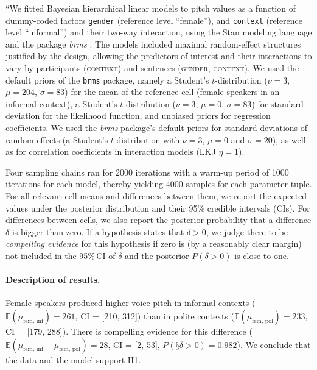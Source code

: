 \documentclass[nobib]{tufte-handout}
\begin{document}
``We fitted Bayesian hierarchical linear models to pitch values as a function of dummy-coded
factors \texttt{gender} (reference level ``female''), and \texttt{context} (reference level
``informal'') and their two-way interaction, using the Stan modeling language
\citep{carpenter2016stan} and the package \emph{brms} \citep{buerkner2016brms}. The models
included maximal random-effect structures justified by the design, allowing the predictors of
interest and their interactions to vary by participants (\textsc{context}) and sentences
(\textsc{gender}, \textsc{context}). We used the default priors of the \texttt{brms} package,
namely a Student's $t$-distribution ($\nu = 3$, $\mu = 204$, $\sigma = 83$) for the mean of the
reference cell (female speakers in an informal context), a Student's $t$-distribution ($\nu =
3$, $\mu = 0$, $\sigma = 83$) for standard deviation for the likelihood function, and unbiased
priors for regression coefficients. We used the \textit{brms} package's default priors for
standard deviations of random effects (a Student's $t$-distribution with $\nu = 3$, $\mu = 0$
and $\sigma = 20$), as well as for correlation coefficients in interaction models (LKJ $\eta =
1$).

Four sampling chains ran for 2000 iterations with a warm-up period of 1000 iterations for each
model, thereby yielding 4000 samples for each parameter tuple. For all relevant cell means and differences
between them, we report the expected values under the posterior distribution and their 95\%
credible intervals (CIs). For differences between cells, we also report the posterior
probability that a difference $\delta$ is bigger than zero. If a hypothesis states that
$\delta >0$, we judge there to be \emph{compelling evidence} for this hypothesis if zero is (by
a reasonably clear margin) not included in the 95\%\,CI of $\delta$ and the posterior $P(\delta
>0)$ is close to one.

\paragraph{Description of results.}  

Female speakers produced higher voice pitch in informal contexts ($\mathbb{E}(\mu_{\text{fem,
    inf}}) = 261$, CI = [210, 312]) than in polite contexts ($\mathbb{E}(\mu_{\text{fem,
    pol}}) = 233$, CI = [179, 288]). There is compelling evidence for this difference
($\mathbb{E}(\mu_{\text{fem, inf}} - \mu_{\text{fem, pol}}) = 28$, CI = [2, 53], $P(§\delta
> 0) = 0.982$). We conclude that the data and the model support H1.
\end{document}
